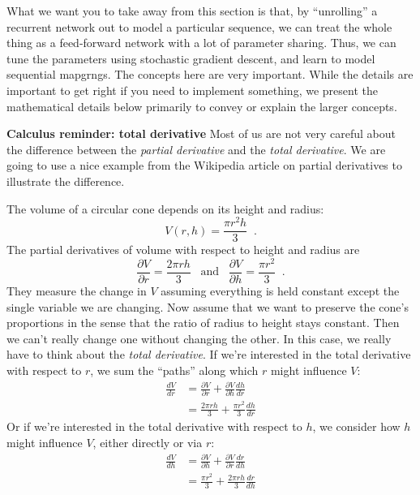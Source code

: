 \bigskip 
\begin{noticebox}
  What we want you to take away from this section is that, by
  ``unrolling'' a recurrent network out to model a particular
  sequence, we can treat the whole thing as a feed-forward network
  with a lot of parameter sharing.  Thus, we can tune the parameters
  using stochastic gradient descent, and learn to model sequential
  mapgrngs.  The concepts here are very important.  While the details
  are important to get right if you need to implement something, we
  present the mathematical details below primarily to convey or
  explain the larger concepts.
\end{noticebox}


\begin{examplebox} {\bf Calculus reminder: total derivative} Most of
  us are not very careful about the difference between the {\em
    partial derivative} and the {\em total derivative}.  We are going
  to use a nice example from the Wikipedia article on partial
  derivatives to illustrate the difference.

The volume of a circular cone depends on its height and radius:
\begin{equation}
V(r, h) = \frac{\pi r^2 h}{3}\;\;.
\end{equation}
The partial derivatives of volume with respect to height and radius
are
\begin{equation}
\frac{\partial V}{\partial r} = \frac{2\pi r
    h}{3}\;\;\;\text{and}\;\;\; 
\frac{\partial V}{\partial h} = \frac{\pi r^2}{3}\;\;.
\end{equation}
They measure the change in $V$ assuming everything is held constant
except the single variable we are changing.
Now assume that we want to preserve the cone's proportions in the sense that the ratio of radius to height stays constant. 
Then we can't really change one without changing the other.  
In this case, we really have to think about the {\em total derivative}. 
If we're interested in the total derivative with respect to $r$, we sum the ``paths'' along which $r$ might influence $V$:
\begin{align}
\frac{dV}{dr} & = \frac{\partial V}{\partial r} + \frac{\partial
  V}{\partial h} \frac{dh}{dr} \\
& = \frac{2 \pi r h}{3} + \frac{\pi r^2}{3} \frac{dh}{dr} 
\end{align}
Or if we're interested in the total derivative with respect to $h$, we consider how $h$ might influence $V$, either directly or via $r$:
\begin{align}
\frac{dV}{dh} & = \frac{\partial V}{\partial h} + \frac{\partial
  V}{\partial r} \frac{dr}{dh} \\
& = \frac{\pi r^2}{3} + \frac{2 \pi r h}{3} \frac{dr}{dh} 
\end{align}


\end{examplebox}
